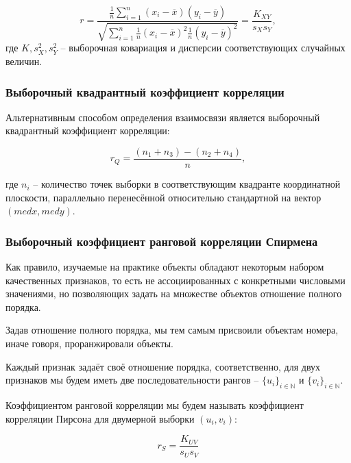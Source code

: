 \begin{equation}\label{eq:pearson}
	r = \frac{\frac{1}{n} \displaystyle \sum_{i=1}^{n}{\left(x_i - \overline{x}\right)\left(y_i - \overline{y}\right)}}{\sqrt{\displaystyle \sum_{i=1}^{n}{\frac{1}{n}\left(x_i - \overline{x}\right)^2\frac{1}{n}\left(y_i - \overline{y}\right)^2}}} = \frac{K_{XY}}{s_X s_Y},
\end{equation}
где $K, s_X^2, s_Y^2$ -- выборочная ковариация и дисперсии соответствующих случайных величин.

\subsubsection{Выборочный квадрантный коэффициент корреляции}
Альтернативным способом определения взаимосвязи является выборочный квадрантный коэффициент корреляции:

\begin{equation}\label{eq:rq}
	r_Q=\frac{(n_1 + n_3) - (n_2 + n_4)}{n},
\end{equation}

где $n_i$ -- количество точек выборки в соответствующим квадранте координатной плоскости, параллельно перенесённой относительно стандартной на вектор $(med x, med y)$.

\subsubsection{Выборочный коэффициент ранговой корреляции Спирмена}

Как правило, изучаемые на практике объекты обладают некоторым набором качественных признаков, то есть не ассоциированных с конкретными числовыми значениями, но позволяющих задать на множестве объектов отношение полного порядка.

Задав отношение полного порядка, мы тем самым присвоили объектам номера, иначе говоря, проранжировали объекты.

Каждый признак задаёт своё отношение порядка, соответственно, для двух признаков мы будем иметь две последовательности рангов -- $\{u_i\}_{i \in \mathbb{N}}$ и $\{v_i\}_{i \in \mathbb{N}}$.

Коэффициентом ранговой корреляции мы будем называть коэффициент корреляции Пирсона для двумерной выборки $(u_i, v_i)$:

\begin{equation}\label{eq:spearman}
	r_S = \frac{K_{UV}}{s_U s_V}
\end{equation}

